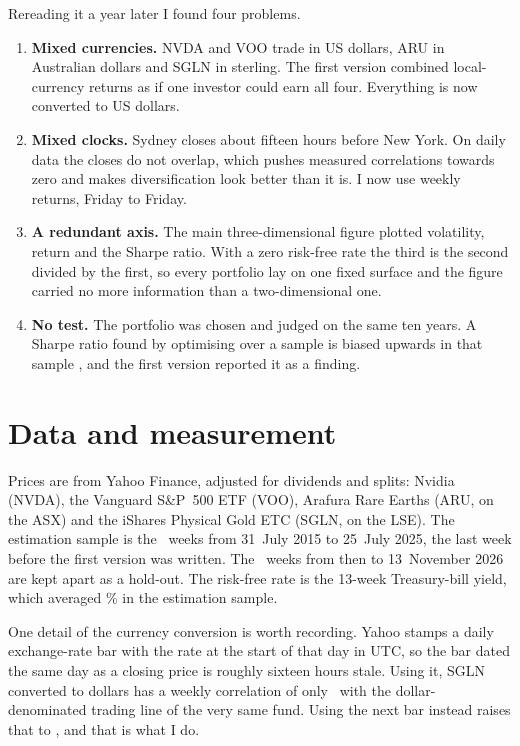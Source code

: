 \documentclass[11pt,a4paper]{article}
\begin{document}
Rereading it a year later I found four problems.

\begin{enumerate}
\item \textbf{Mixed currencies.} NVDA and VOO trade in US dollars, ARU in Australian dollars and SGLN in sterling. The first version combined local-currency returns as if one investor could earn all four. Everything is now converted to US dollars.
\item \textbf{Mixed clocks.} Sydney closes about fifteen hours before New York. On daily data the closes do not overlap, which pushes measured correlations towards zero and makes diversification look better than it is. I now use weekly returns, Friday to Friday.
\item \textbf{A redundant axis.} The main three-dimensional figure plotted volatility, return and the Sharpe ratio. With a zero risk-free rate the third is the second divided by the first, so every portfolio lay on one fixed surface and the figure carried no more information than a two-dimensional one.
\item \textbf{No test.} The portfolio was chosen and judged on the same ten years. A Sharpe ratio found by optimising over a sample is biased upwards in that sample \citep{michaud}, and the first version reported it as a finding.
\end{enumerate}

\section{Data and measurement}

Prices are from Yahoo Finance, adjusted for dividends and splits: Nvidia (NVDA), the Vanguard S\&P~500 ETF (VOO), Arafura Rare Earths (ARU, on the ASX) and the iShares Physical Gold ETC (SGLN, on the LSE). The estimation sample is the \nWeeks\ weeks from 31~July 2015 to 25~July 2025, the last week before the first version was written. The \hoWeeks\ weeks from then to 13~November 2026 are kept apart as a hold-out. The risk-free rate is the 13-week Treasury-bill yield, which averaged \rfMean\% in the estimation sample.

One detail of the currency conversion is worth recording. Yahoo stamps a daily exchange-rate bar with the rate at the start of that day in UTC, so the bar dated the same day as a closing price is roughly sixteen hours stale. Using it, SGLN converted to dollars has a weekly correlation of only \goldCorrBad\ with the dollar-denominated trading line of the very same fund. Using the next bar instead raises that to \goldCorrGood, and that is what I do.
\end{document}
